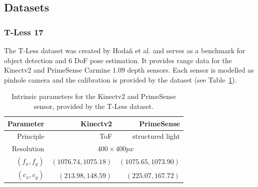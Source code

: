 \subsection{Datasets}

\subsubsection{T-Less 17}

The T-Less dataset was created by Hoda{\v{n}} et al.\cite{hodan_wacv2017} and serves as a benchmark for object detection and 6 \acrshort{DoF} pose estimation.
It provides range data for the Kinectv2 and PrimeSense Carmine 1.09 depth sensors.
Each sensor is modelled as pinhole camera and the calibration is provided by the dataset (see Table~\ref{tab:intrinsic_tless}).
{\renewcommand{\arraystretch}{1.2}%
\setlength{\tabcolsep}{1em}%
\begin{table}
    \begin{tabular}[H]{rrr}
    \toprule
    \textbf{Parameter} & \textbf{Kinectv2} & \textbf{PrimeSense} \\
    \midrule
    Principle & \acrshort{ToF} & structured light \\
    Resolution & \multicolumn{2}{c}{$400 \times 400px$} \\
    $(f_x, f_y)$ & $(1076.74, 1075.18)$ & $(1075.65, 1073.90)$ \\
    $(c_x, c_y)$ & $(213.98, 148.59)$ & $(225.07, 167.72)$ \\
    \bottomrule
    \end{tabular}
    \caption{Intrinsic parameters for the Kinectv2 and PrimeSense sensor, provided by the T-Less dataset.}\label{tab:intrinsic_tless}
\end{table}}

